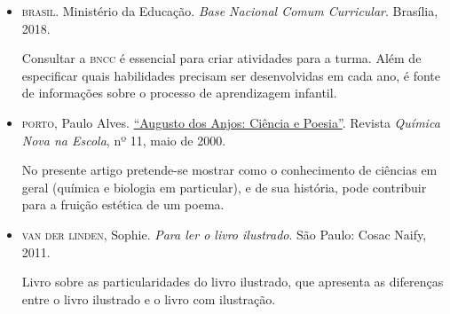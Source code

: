 \documentclass[11pt]{extarticle}
\begin{document}
\begin{itemize}
\item \textsc{brasil}. Ministério da Educação. \textit{Base Nacional Comum Curricular}. Brasília, 2018.

Consultar a \textsc{bncc} é essencial para criar atividades para a turma. Além de especificar 
quais habilidades precisam ser desenvolvidas em cada ano, é fonte de informações sobre 
o processo de aprendizagem infantil. 

 \item \textsc{porto}, Paulo Alves. \href{http://qnesc.sbq.org.br/online/qnesc11/v11a07.pdf}{``Augusto dos 
 	Anjos: Ciência e Poesia''}. Revista \textit{Química Nova na Escola},
	nº 11, maio de 2000.  

No presente artigo pretende-se mostrar como o conhecimento de ciências em geral (química e biologia em
particular), e de sua história, pode contribuir para a fruição estética de um poema.


\item \textsc{van der linden}, Sophie. \textit{Para ler o livro ilustrado}. São Paulo: Cosac Naify, 2011.

Livro sobre as particularidades do livro ilustrado, que apresenta as diferenças entre o livro ilustrado e o livro com ilustração. 
\end{itemize}
\end{document}
